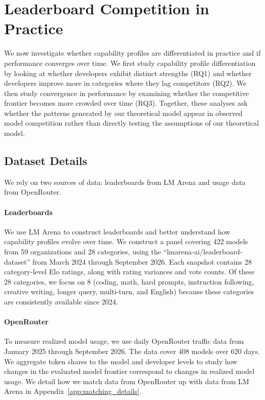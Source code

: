 \section{Leaderboard Competition in Practice}
We now investigate whether capability profiles are differentiated in practice and if performance converges over time. 
We first study capability profile differentiation by looking at whether developers exhibit distinct strengths (RQ1) and whether developers improve more in categories  where they lag competitors (RQ2). 
We then study convergence in performance by examining whether the competitive frontier becomes more crowded over time (RQ3). 
Together, these analyses ask whether the patterns generated by our theoretical model appear in observed model competition rather than directly testing the assumptions of our theoretical model. 

\subsection{Dataset Details}
We rely on two sources of data: leaderboards from LM Arena and usage data from OpenRouter.
\paragraph{Leaderboards}
We use LM Arena to construct leaderboards and better understand how capability profiles evolve over time. 
We construct a panel covering 422 models from 59 organizations and 28 categories, using the ``lmarena-ai/leaderboard-dataset'' from March 2024 through September 2026. 
Each snapshot contains 28 category-level Elo ratings, along with rating variances and vote counts. 
Of these 28 categories, we focus on 8 (coding, math, hard prompts, instruction following, creative writing, longer query, multi-turn, and English) because these categories are consistently available since 2024. 

\paragraph{OpenRouter}
To measure realized model usage, we use daily OpenRouter traffic data from January 2025 through September 2026. The data cover 408 models over 620 days.
We aggregate token shares to the model and developer levels to study how changes in the evaluated model frontier correspond to changes in realized model usage.
We detail how we match data from OpenRouter up with data from LM Arena in Appendix~\ref{app:matching_details}. 

